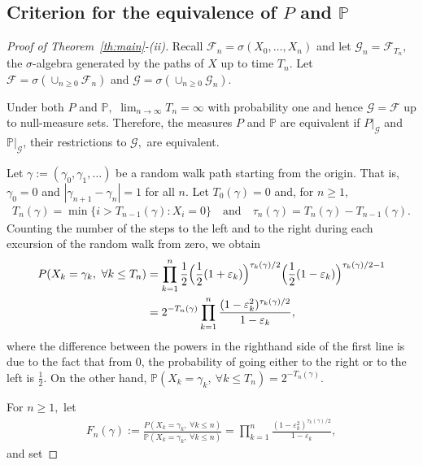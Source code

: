 \documentclass[12pt]{amsart}
\begin{document}
\subsection{Criterion for the equivalence of $P$ and ${{\mathbb P}}$}
\label{part}
\begin{proof}[Proof of Theorem~\ref{th:main}-(ii)]
Recall ${{\mathcal F}}_n=\sigma(X_0,\dots,X_n)$ and let
${{\mathcal G}}_n={{\mathcal F}}_{T_n},$ the $\sigma$-algebra generated by the paths
of $X$ up to time $T_n$. Let ${{\mathcal F}} = \sigma(\cup_{n\ge 0} {{\mathcal F}}_n)$
and ${{\mathcal G}} = \sigma(\cup_{n\ge 0} {{\mathcal G}}_n).$
\par
Under both $P$ and ${{\mathbb P}},$ $\lim_{n\to\infty}T_n=\infty$ with
probability one and hence ${{\mathcal G}} = {{\mathcal F}}$ up to null-measure sets.
Therefore, the measures $P$ and ${{\mathbb P}}$ are equivalent if $P|_{{\mathcal G}}$
and ${{\mathbb P}}|_{{\mathcal G}}$, their restrictions to ${{\mathcal G}},$ are equivalent.
\par
Let $\gamma:=(\gamma_0,\gamma_1,\dots)$ be a random walk path
starting from the origin. That is, $\gamma_0=0$ and
$|\gamma_{n+1}-\gamma_n|=1$ for all $n$. Let $T_0(\gamma)=0$ and,
for $n\geq 1,$ \begin{eqnarray} \label{tigamma}
T_n(\gamma)=\min\{i>T_{n-1}(\gamma): X_i=0\}\quad \mbox{and}\quad
\tau_n(\gamma)=T_n(\gamma)-T_{n-1}(\gamma).\end{eqnarray} Counting the number
of the steps to the left and to the right during each excursion of
the random walk from zero, we obtain
\begin{align}
\nonumber
P(X_k=\gamma_k,~\forall k\le T_n)&= \prod_{k=1}^{n}
\frac 12 \Bigl(\frac 12 (1+{\varepsilon}_k)\Bigr)^{\tau_k(\gamma)/2}
\Bigl(\frac 12 (1-{\varepsilon}_k)\Bigr)^{\tau_k(\gamma)/2-1}\\
\label{counting}
&=2^{-T_n(\gamma)} \prod_{k=1}^n\frac{
(1-{\varepsilon}_k^2)^{\tau_k(\gamma)/2}}{1-{\varepsilon}_k},
\end{align}
where the difference between the powers in the righthand side of the
first line is due to the fact that from $0$, the probability of
going either to the right or to the left is $\frac 12$. On the other
hand, ${{\mathbb P}}(X_k=\gamma_k,~\forall k\le T_n)=2^{-T_n(\gamma)}$.
\par
For $n\geq 1,$ let \begin{eqnarray} \label{rn-tin}
F_n(\gamma):=\frac{P(X_k=\gamma_k,~\forall k\le
n)}{{{\mathbb P}}(X_k=\gamma_k,~\forall k\le n)}=\prod_{k=1}^{n} \frac
{(1-{\varepsilon}_k^2)^{\tau_k(\gamma)/2}}{1-{\varepsilon}_k},\end{eqnarray} and set

\end{proof}
\end{document}
